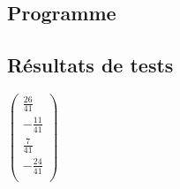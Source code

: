 \documentclass{report}
\begin{document}
  	  \subsection{Programme}
        
      \newpage
      \subsection{Résultats de tests}
          $\begin{pmatrix}
              \frac{26}{41} \\
              -\frac{11}{41} \\
              \frac{7}{41} \\
              -\frac{24}{41} \\
          \end{pmatrix}$
\end{document}
